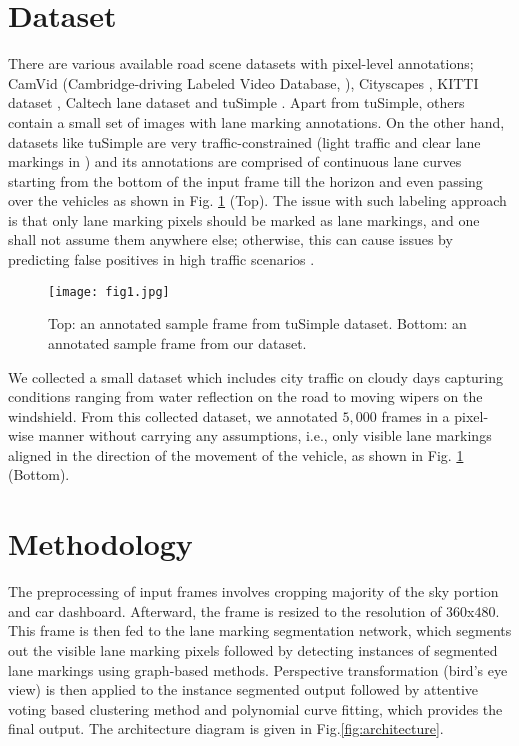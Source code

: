 \documentclass[fleqn,10pt,twocolumn]{ICCAS2019}
\begin{document}
\section{Dataset} \label{sec.2}

There are various available road scene datasets with pixel-level annotations; CamVid (Cambridge-driving Labeled Video Database, \cite{camvid}), Cityscapes \cite{citysc}, KITTI dataset \cite{kitti}, Caltech lane dataset \cite{caltechlane} and tuSimple \cite{tusimple}. Apart from tuSimple, others contain a small set of images with lane marking annotations. On the other hand, datasets like tuSimple are very traffic-constrained (light traffic and clear lane markings in \cite{spcnn}) and its annotations are comprised of continuous lane curves starting from the bottom of the input frame till the horizon and even passing over the vehicles as shown in Fig. \ref{comparison} (Top). The issue with such labeling approach is that only lane marking pixels should be marked as lane markings, and one shall not assume them anywhere else; otherwise, this can cause issues by predicting false positives in high traffic scenarios \cite{spcnn}.

\begin{figure}[t]
\begin{center}
\texttt{[image: fig1.jpg]}
\caption{Top: an annotated sample frame from tuSimple dataset. Bottom: an annotated sample frame from our dataset.}
\label{comparison}
\end{center}
\end{figure}

We collected a small dataset which includes city traffic on cloudy days capturing conditions ranging from water reflection on the road to moving wipers on the windshield. From this collected dataset, we annotated $5,000$ frames in a pixel-wise manner without carrying any assumptions, i.e., only visible lane markings aligned in the direction of the movement of the vehicle, as shown in Fig. \ref{comparison} (Bottom).

\section{Methodology}

The preprocessing of input frames involves cropping majority of the sky portion and car dashboard. Afterward, the frame is resized to the resolution of $360$x$480$. This frame is then fed to the lane marking segmentation network, which segments out the visible lane marking pixels followed by detecting instances of segmented lane markings using graph-based methods. Perspective transformation (bird's eye view) is then applied to the instance segmented output followed by attentive voting based clustering method and polynomial curve fitting, which provides the final output. The architecture diagram is given in Fig.\ref{fig:architecture}.
\end{document}
